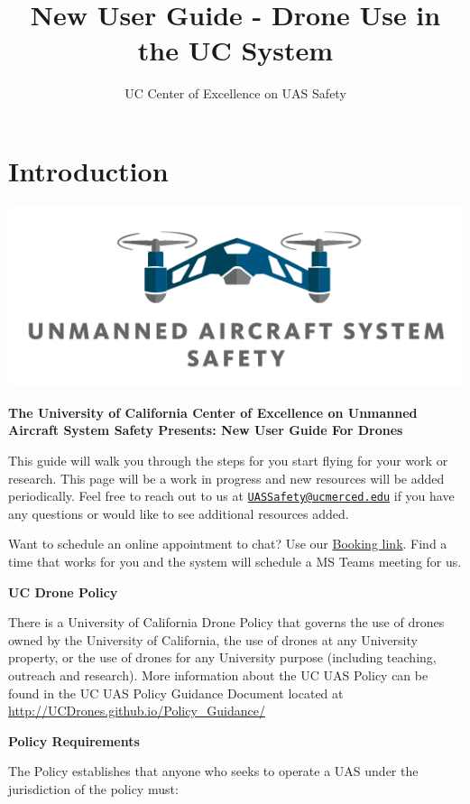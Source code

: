 \documentclass[
  12pt,
]{book}
\title{New User Guide - Drone Use in the UC System}
\author{UC Center of Excellence on UAS Safety}
\date{}
\begin{document}
\maketitle

{
\setcounter{tocdepth}{1}
\tableofcontents
}
\chapter*{Introduction}\label{introduction}

\begin{center}\includegraphics[width=0.5\linewidth]{images/COE_logo} \end{center}

\textbf{The University of California Center of Excellence on Unmanned Aircraft System Safety Presents: New User Guide For Drones}

This guide will walk you through the steps for you start flying for your work or research. This page will be a work in progress and new resources will be added periodically. Feel free to reach out to us at \href{mailto:UASSafety@ucmerced.edu}{\nolinkurl{UASSafety@ucmerced.edu}} if you have any questions or would like to see additional resources added.

Want to schedule an online appointment to chat? Use our \href{https://outlook.office365.com/owa/calendar/UCCenterofExcellenceonUASSafety@merced.onmicrosoft.com/bookings/}{Booking link}. Find a time that works for you and the system will schedule a MS Teams meeting for us.

\textbf{UC Drone Policy}

There is a University of California Drone Policy that governs the use of drones owned by the University of California, the use of drones at any University property, or the use of drones for any University purpose (including teaching, outreach and research). More information about the UC UAS Policy can be found in the UC UAS Policy Guidance Document located at \url{http://UCDrones.github.io/Policy_Guidance/}

\textbf{Policy Requirements}

The Policy establishes that anyone who seeks to operate a UAS under the jurisdiction of the policy must:
\end{document}
